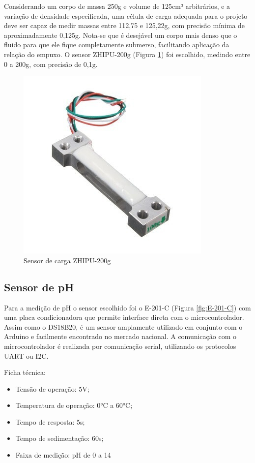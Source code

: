 Considerando um corpo de massa 250g e volume de 125cm³ arbitrários, e a variação de densidade especificada, uma célula de carga adequada para o projeto deve ser capaz de medir massas entre 112,75 e 125,22g, com precisão mínima de aproximadamente 0,125g. Nota-se que é desejável um corpo mais denso que o fluido para que ele fique completamente submerso, facilitando aplicação da relação do empuxo. O sensor ZHIPU-200g (Figura \ref{fig:ZHIPU-200g}) foi escolhido, medindo entre 0 a 200g, com precisão de 0,1g.


\begin{figure}[h]
    \centering
    \includegraphics[scale=0.40]{figuras/projeto/hardware/ZHIPU-200g.jpg}
    \caption{Sensor de carga ZHIPU-200g}
    \label{fig:ZHIPU-200g}
\end{figure}


\subsection{Sensor de pH}

Para a medição de pH o sensor escolhido foi o E-201-C (Figura \ref{fig:E-201-C}) com uma placa condicionadora que permite interface direta com o microcontrolador. Assim como o DS18B20, é um sensor amplamente utilizado em conjunto com o Arduino e facilmente encontrado no mercado nacional. A comunicação com o microcontrolador é realizada por comunicação serial, utilizando os protocolos UART ou I2C.


Ficha técnica:
\begin{itemize}
    \item Tensão de operação: 5V;
    \item Temperatura de operação: 0°C a 60°C;
    \item Tempo de resposta: 5s;
    \item Tempo de sedimentação: 60s;
    \item Faixa de medição: pH de 0 a 14
\end{itemize}

